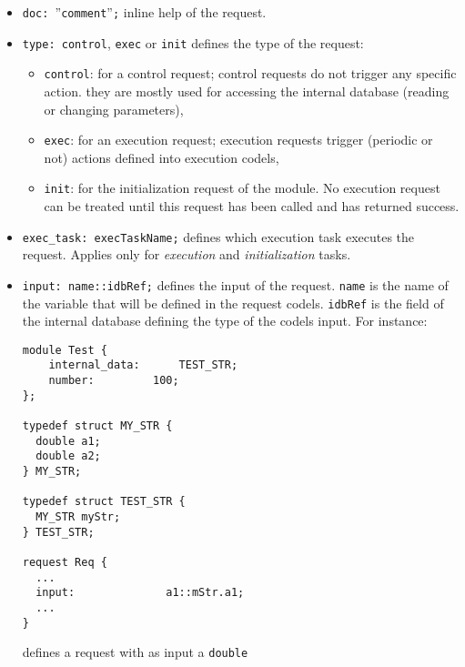 \begin{itemize}
\item[]{\tt doc: }''\texttt{comment}''{\tt;} inline help of the request.
\item[]{\tt type:  control}, {\tt exec} or {\tt init} defines the type of the request:
  \begin{itemize}
  \item {\tt control}: for a control request; control requests do not
    trigger any specific action. they are mostly used for accessing the
    internal database (reading or changing parameters),
  \item {\tt exec}: for an execution request; execution requests trigger
    (periodic or not) actions defined into execution codels,
  \item {\tt init}: for the initialization request of the module. No
    execution request can be treated until this request has been
    called and has returned success.
  \end{itemize}

\item[]{\tt exec\_task:  execTaskName;} defines which execution task
executes the request. Applies only for {\em execution} and {\em
  initialization} tasks.

\item[]\texttt{input: name::idbRef;} defines the input of the
  request. \texttt{name} is the name of the variable that will be
  defined in the request codels. \texttt{idbRef} is the field of the
  internal database defining the type of the codels input. For instance:\\
\begin{verbatim}
module Test {
    internal_data:	    TEST_STR;
    number:		    100;
}; 

typedef struct MY_STR {
  double a1;
  double a2;
} MY_STR;

typedef struct TEST_STR {
  MY_STR myStr;
} TEST_STR;

request Req {
  ...
  input:              a1::mStr.a1;
  ...
}
\end{verbatim}
defines a request with as input a {\tt double}\\


\end{itemize}
